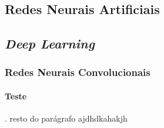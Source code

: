 \subsection{Redes Neurais Artificiais}


\subsection{\textit{Deep Learning}}


\subsubsection{Redes Neurais Convolucionais}

\paragraph{Teste}. resto do parágrafo ajdhdkahakjh
